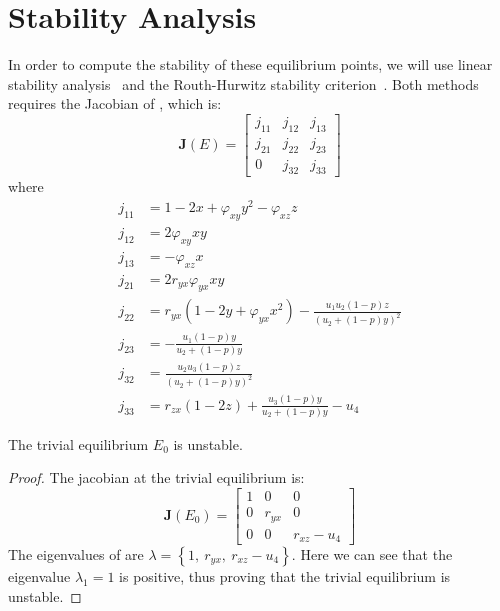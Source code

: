 \section{Stability Analysis}\label{sec:stability-analysis}
In order to compute the stability of these equilibrium points, we will use linear stability analysis~\cite{Strogatz9780813349107} and the Routh-Hurwitz stability criterion~\cite{YANG2002615621}. Both methods requires the Jacobian of , which is:
\begin{equation}\label{matrix:jacobian-model}
    \textbf{J}\left(E\right) = \begin{bmatrix}
        j_{11} & j_{12} & j_{13}\\
        j_{21} & j_{22} & j_{23}\\
        0 & j_{32} & j_{33}
    \end{bmatrix}
\end{equation}
where
\begin{align*}
    j_{11} &= 1-2x+\varphi_{xy}y^2-\varphi_{xz}z\\
    j_{12} &= 2\varphi_{xy}xy\\
    j_{13} &= -\varphi_{xz}x\\
    j_{21} &= 2r_{yx}\varphi_{yx}xy\\
    j_{22} &= r_{yx}\left(1-2y+\varphi_{yx}x^2\right)-\frac{u_1u_2\left(1-p\right)z}{\left(u_2+\left(1-p\right)y\right)^2}\\
    j_{23} &= -\frac{u_1\left(1-p\right)y}{u_2+\left(1-p\right)y}\\
    j_{32} &= \frac{u_2u_3\left(1-p\right)z}{\left(u_2+\left(1-p\right)y\right)^2}\\
    j_{33} &= r_{zx}\left(1-2z\right)+\frac{u_3\left(1-p\right)y}{u_2+\left(1-p\right)y}-u_4
\end{align*}

\begin{theorem}\label{thm:trivial-stability}
    The trivial equilibrium $E_0$ is unstable.
\end{theorem}
\begin{proof}
    The jacobian at the trivial equilibrium is:
    \begin{equation}\label{matrix:jacobian-trivial}
        \textbf{J}\left(E_0\right) = \begin{bmatrix}
            1 & 0 & 0\\
            0 & r_{yx} & 0\\
            0 & 0 & r_{xz}-u_4
        \end{bmatrix}
    \end{equation}
    The eigenvalues of  are $\lambda=\left\{1,\ r_{yx},\ r_{xz}-u_4\right\}$. Here we can see that the eigenvalue $\lambda_1=1$ is positive, thus proving that the trivial equilibrium is unstable.
\end{proof}


